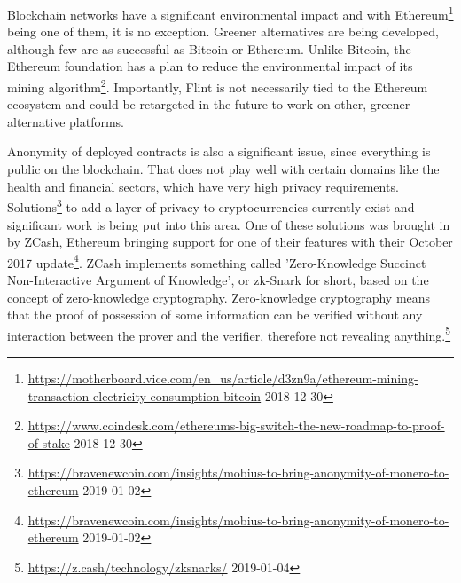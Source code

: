 Blockchain networks have a significant environmental impact and with Ethereum\footnote{\url{https://motherboard.vice.com/en_us/article/d3zn9a/ethereum-mining-transaction-electricity-consumption-bitcoin} 2018-12-30} being one of them, it is no exception. Greener alternatives are being developed, although few are as successful as Bitcoin or Ethereum. Unlike Bitcoin, the Ethereum foundation has a plan to reduce the environmental impact of its mining algorithm\footnote{\url{https://www.coindesk.com/ethereums-big-switch-the-new-roadmap-to-proof-of-stake} 2018-12-30}. Importantly, Flint is not necessarily tied to the Ethereum ecosystem and could be retargeted in the future to work on other, greener alternative platforms.

Anonymity of deployed contracts is also a significant issue, since everything is public on the blockchain. That does not play well with certain domains like the health and financial sectors, which have very high privacy requirements. Solutions\footnote{\url{https://bravenewcoin.com/insights/mobius-to-bring-anonymity-of-monero-to-ethereum} 2019-01-02} to add a layer of privacy to cryptocurrencies currently exist and significant work is being put into this area. One of these solutions was brought in by ZCash, Ethereum bringing support for one of their features with their October 2017 update\footnote{\url{https://bravenewcoin.com/insights/mobius-to-bring-anonymity-of-monero-to-ethereum} 2019-01-02}. ZCash implements something called 'Zero-Knowledge Succinct Non-Interactive Argument of Knowledge', or zk-Snark for short, based on the concept of zero-knowledge cryptography. Zero-knowledge cryptography means that the proof of possession of some information can be verified without any interaction between the prover and the verifier, therefore not revealing anything.\footnote{\url{https://z.cash/technology/zksnarks/} 2019-01-04}
